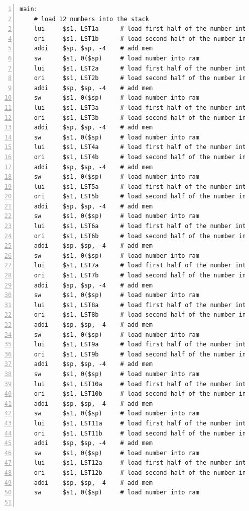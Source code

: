 \documentclass[11pt]{article}
\begin{document}
\begin{lstlisting}[numbers=left,basicstyle=\footnotesize]
main:
    # load 12 numbers into the stack
    lui     $s1, LST1a      # load first half of the number into reg
    ori     $s1, LST1b      # load second half of the number into reg
    addi    $sp, $sp, -4    # add mem
    sw      $s1, 0($sp)     # load number into ram
    lui     $s1, LST2a      # load first half of the number into reg
    ori     $s1, LST2b      # load second half of the number into reg
    addi    $sp, $sp, -4    # add mem
    sw      $s1, 0($sp)     # load number into ram
    lui     $s1, LST3a      # load first half of the number into reg
    ori     $s1, LST3b      # load second half of the number into reg
    addi    $sp, $sp, -4    # add mem
    sw      $s1, 0($sp)     # load number into ram
    lui     $s1, LST4a      # load first half of the number into reg
    ori     $s1, LST4b      # load second half of the number into reg
    addi    $sp, $sp, -4    # add mem
    sw      $s1, 0($sp)     # load number into ram
    lui     $s1, LST5a      # load first half of the number into reg
    ori     $s1, LST5b      # load second half of the number into reg
    addi    $sp, $sp, -4    # add mem
    sw      $s1, 0($sp)     # load number into ram
    lui     $s1, LST6a      # load first half of the number into reg
    ori     $s1, LST6b      # load second half of the number into reg
    addi    $sp, $sp, -4    # add mem
    sw      $s1, 0($sp)     # load number into ram
    lui     $s1, LST7a      # load first half of the number into reg
    ori     $s1, LST7b      # load second half of the number into reg
    addi    $sp, $sp, -4    # add mem
    sw      $s1, 0($sp)     # load number into ram
    lui     $s1, LST8a      # load first half of the number into reg
    ori     $s1, LST8b      # load second half of the number into reg
    addi    $sp, $sp, -4    # add mem
    sw      $s1, 0($sp)     # load number into ram
    lui     $s1, LST9a      # load first half of the number into reg
    ori     $s1, LST9b      # load second half of the number into reg
    addi    $sp, $sp, -4    # add mem
    sw      $s1, 0($sp)     # load number into ram
    lui     $s1, LST10a     # load first half of the number into reg
    ori     $s1, LST10b     # load second half of the number into reg
    addi    $sp, $sp, -4    # add mem
    sw      $s1, 0($sp)     # load number into ram
    lui     $s1, LST11a     # load first half of the number into reg
    ori     $s1, LST11b     # load second half of the number into reg
    addi    $sp, $sp, -4    # add mem
    sw      $s1, 0($sp)     # load number into ram
    lui     $s1, LST12a     # load first half of the number into reg
    ori     $s1, LST12b     # load second half of the number into reg
    addi    $sp, $sp, -4    # add mem
    sw      $s1, 0($sp)     # load number into ram
    

\end{lstlisting}
\end{document}

